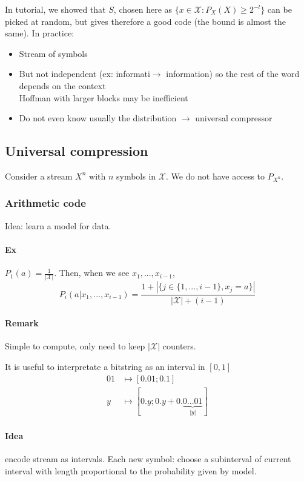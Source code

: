 In tutorial, we showed that $S$, chosen here as $\{x\in \mathcal{X} : P_X(X)\geq 2^{-l}\}$ can be picked at random, but gives therefore a good code (the bound is almost the same).
In practice:
\begin{itemize}
\item Stream of symbols
\item But not independent (ex: informati\textbullet\textbullet $\rightarrow$ information) so the rest of the word depends on the context\\
Hoffman with larger blocks may be inefficient
\item Do not even know usually the distribution $\rightarrow$ universal compressor
\end{itemize}

\subsection{Universal compression}
Consider a stream $X^n$ with $n$ symbols in $\mathcal{X}$. We do not have access to $P_{X^n}$.


\subsubsection{Arithmetic code}
Idea: learn a model for data.

\paragraph{Ex} $P_1(a)=\frac{1}{|\mathcal{X}|}$. Then, when we see $x_1,...,x_{i-1}$, 
\[P_i(a|x_1,...,x_{i-1})=\frac{1+|\{ j\in \{ 1,..., i-1 \}, x_j=a \}|}{|\mathcal{X}|+(i-1)}\]

\paragraph{Remark} Simple to compute, only need to keep $|\mathcal{X}|$ counters.

It is useful to interpretate a bitstring as an interval in $[0,1]$
\begin{align*}
01 & \mapsto [0.01;0.1]\\
y & \mapsto [0.y;0.y+0.\underbrace{0...01}_{|y|}]
\end{align*}

\paragraph{Idea} encode stream as intervals. Each new symbol: choose a subinterval of current interval with length proportional to the probability given by model.

